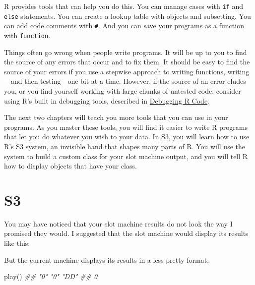 \documentclass[
  letterpaper,
  DIV=11,
  numbers=noendperiod]{scrbook}
\newenvironment{Shaded}{\begin{snugshade}}{\end{snugshade}}
\newcommand{\DocumentationTok}[1]{\textcolor[rgb]{0.37,0.37,0.37}{\textit{#1}}}
\newcommand{\FunctionTok}[1]{\textcolor[rgb]{0.28,0.35,0.67}{#1}}
\newcommand{\NormalTok}[1]{\textcolor[rgb]{0.00,0.23,0.31}{#1}}
\begin{document}
R provides tools that can help you do this. You can manage cases with
\texttt{if} and \texttt{else} statements. You can create a lookup table
with objects and subsetting. You can add code comments with \texttt{\#}.
And you can save your programs as a function with \texttt{function}.

Things often go wrong when people write programs. It will be up to you
to find the source of any errors that occur and to fix them. It should
be easy to find the source of your errors if you use a stepwise approach
to writing functions, writing---and then testing---one bit at a time.
However, if the source of an error eludes you, or you find yourself
working with large chunks of untested code, consider using R's built in
debugging tools, described in \hyperref[sec-appendix-debug]{Debugging R
Code}.

The next two chapters will teach you more tools that you can use in your
programs. As you master these tools, you will find it easier to write R
programs that let you do whatever you wish to your data. In
\hyperref[sec-s3]{S3}, you will learn how to use R's S3 system, an
invisible hand that shapes many parts of R. You will use the system to
build a custom class for your slot machine output, and you will tell R
how to display objects that have your class.

\chapter{S3}\label{sec-s3}

You may have noticed that your slot machine results do not look the way
I promised they would. I suggested that the slot machine would display
its results like this:

\begin{Shaded}
\end{Shaded}

But the current machine displays its results in a less pretty format:

\begin{Shaded}
\begin{Highlighting}[]
\FunctionTok{play}\NormalTok{()}
\DocumentationTok{\#\# "0"  "0" "DD" }
\DocumentationTok{\#\# 0}
\end{Highlighting}
\end{Shaded}
\end{document}
